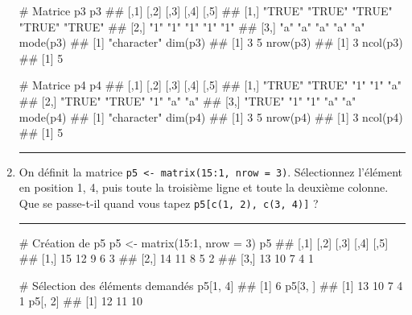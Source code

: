 \documentclass[12pt,twosided, notitlepage]{book}
\newenvironment{Shaded}{}{}
\newcommand{\CommentTok}[1]{\textcolor[rgb]{0.00,0.50,0.00}{#1}}
\newcommand{\DataTypeTok}[1]{#1}
\newcommand{\DecValTok}[1]{#1}
\newcommand{\KeywordTok}[1]{\textcolor[rgb]{0.00,0.00,1.00}{#1}}
\newcommand{\NormalTok}[1]{#1}
\newcommand{\OperatorTok}[1]{#1}
\newcommand{\StringTok}[1]{\textcolor[rgb]{0.00,0.50,0.50}{#1}}
\newif \ifsol
\renewenvironment{Shaded}{\begin{snugshade}}{\end{snugshade}}
\begin{document}
\begin{enumerate}
\begin{Shaded}
\begin{Highlighting}[]
\CommentTok{# Matrice p3}
\NormalTok{p3}
\NormalTok{  ##      [,1]   [,2]   [,3]   [,4]   [,5]  }
\NormalTok{  ## [1,] "TRUE" "TRUE" "TRUE" "TRUE" "TRUE"}
\NormalTok{  ## [2,] "1"    "1"    "1"    "1"    "1"   }
\NormalTok{  ## [3,] "a"    "a"    "a"    "a"    "a"}
\KeywordTok{mode}\NormalTok{(p3)}
\NormalTok{  ## [1] "character"}
\KeywordTok{dim}\NormalTok{(p3)}
\NormalTok{  ## [1] 3 5}
\KeywordTok{nrow}\NormalTok{(p3)}
\NormalTok{  ## [1] 3}
\KeywordTok{ncol}\NormalTok{(p3)}
\NormalTok{  ## [1] 5}

\CommentTok{# Matrice p4}
\NormalTok{p4}
\NormalTok{  ##      [,1]   [,2]   [,3] [,4] [,5]}
\NormalTok{  ## [1,] "TRUE" "TRUE" "1"  "1"  "a" }
\NormalTok{  ## [2,] "TRUE" "TRUE" "1"  "a"  "a" }
\NormalTok{  ## [3,] "TRUE" "1"    "1"  "a"  "a"}
\KeywordTok{mode}\NormalTok{(p4)}
\NormalTok{  ## [1] "character"}
\KeywordTok{dim}\NormalTok{(p4)}
\NormalTok{  ## [1] 3 5}
\KeywordTok{nrow}\NormalTok{(p4)}
\NormalTok{  ## [1] 3}
\KeywordTok{ncol}\NormalTok{(p4)}
\NormalTok{  ## [1] 5}
\end{Highlighting}
\end{Shaded}

  \begin{center} \rule{0.5\linewidth}{\linethickness}\end{center} 
    \bigskip 
    \fi
\item
  On définit la matrice
  \texttt{p5\ \textless{}-\ matrix(15:1,\ nrow\ =\ 3)}. Sélectionnez
  l'élément en position 1, 4, puis toute la troisième ligne et toute la
  deuxième colonne\index{\texttt{[}}. Que se passe-t-il quand vous tapez
  \texttt{p5{[}c(1,\ 2),\ c(3,\ 4){]}} ?

  \ifsol 

  \begin{center} \rule{0.5\linewidth}{\linethickness}\end{center}

\begin{Shaded}
\begin{Highlighting}[]
\CommentTok{# Création de p5}
\NormalTok{p5 <-}\StringTok{ }\KeywordTok{matrix}\NormalTok{(}\DecValTok{15}\OperatorTok{:}\DecValTok{1}\NormalTok{, }\DataTypeTok{nrow =} \DecValTok{3}\NormalTok{)}
\NormalTok{p5}
\NormalTok{  ##      [,1] [,2] [,3] [,4] [,5]}
\NormalTok{  ## [1,]   15   12    9    6    3}
\NormalTok{  ## [2,]   14   11    8    5    2}
\NormalTok{  ## [3,]   13   10    7    4    1}

\CommentTok{# Sélection des éléments demandés}
\NormalTok{p5[}\DecValTok{1}\NormalTok{, }\DecValTok{4}\NormalTok{]}
\NormalTok{  ## [1] 6}
\NormalTok{p5[}\DecValTok{3}\NormalTok{, ]}
\NormalTok{  ## [1] 13 10  7  4  1}
\NormalTok{p5[, }\DecValTok{2}\NormalTok{]}
\NormalTok{  ## [1] 12 11 10}


\end{Highlighting}
\end{Shaded}
\end{enumerate}
\end{document}
